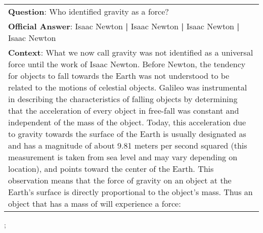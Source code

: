 \begin{figure*}[ht]
{\begin{tabular}{p{}}
            \textbf{Question}: Who identified gravity as a force?                                                                                                                                                                                                                                                                                                                                                                                                                                                                                                                                                                                                                                                                                                                                                                                                                                                                                                       \\
            \textbf{Official Answer}: Isaac Newton \textbf{|} Isaac Newton \textbf{|} Isaac Newton \textbf{|} Isaac Newton                                                                                                                                                                                                                                                                                                                                                                                                                                                                                                                                                                                                                                                                                                                                                                                                                                              \\
            \textbf{Context}: What we now call gravity was not identified as a universal force until the work of Isaac Newton. Before Newton, the tendency for objects to fall towards the Earth was not understood to be related to the motions of celestial objects. Galileo was instrumental in describing the characteristics of falling objects by determining that the acceleration of every object in free-fall was constant and independent of the mass of the object. Today, this acceleration due to gravity towards the surface of the Earth is usually designated as  and has a magnitude of about 9.81 meters per second squared (this measurement is taken from sea level and may vary depending on location), and points toward the center of the Earth. This observation means that the force of gravity on an object at the Earth's surface is directly proportional to the object's mass. Thus an object that has a mass of  will experience a force: \\
        \end{tabular}
    };
    \label{fig:ex-573784fa1c45671900574483}
\end{figure*}

